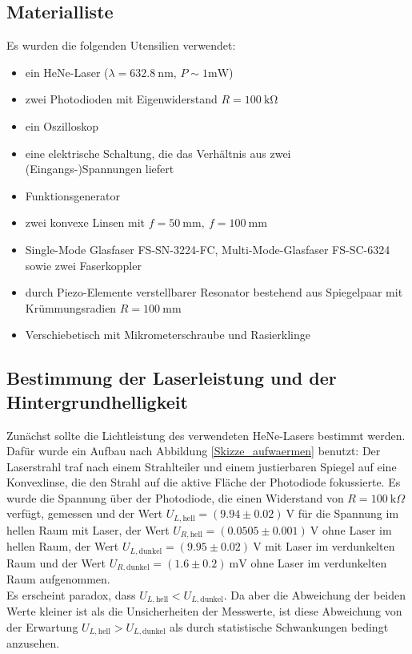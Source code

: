 \documentclass[11pt,a4paper,oneside]{scrartcl}
\begin{document}
\subsection{Materialliste}
Es wurden die folgenden Utensilien verwendet:
\begin{itemize}
\item ein HeNe-Laser ($\lambda=632.8\ \mathrm{nm}$, $P\sim 1\mathrm{mW}$)
\item zwei Photodioden mit Eigenwiderstand $R=100\ \mathrm{k\Omega}$
\item ein Oszilloskop
\item eine elektrische Schaltung, die das Verhältnis aus zwei (Eingangs-)Spannungen liefert
\item Funktionsgenerator
\item zwei konvexe Linsen mit $f=50\ \mathrm{mm},\ f=100\ \mathrm{mm}$
\item Single-Mode Glasfaser FS-SN-3224-FC, Multi-Mode-Glasfaser FS-SC-6324 sowie zwei Faserkoppler
\item durch Piezo-Elemente verstellbarer Resonator bestehend aus Spiegelpaar mit Krümmungsradien $R=100\ \mathrm{mm}$
\item Verschiebetisch mit Mikrometerschraube und Rasierklinge
\end{itemize}
\subsection{Bestimmung der Laserleistung und der Hintergrundhelligkeit}
Zunächst sollte die Lichtleistung des verwendeten HeNe-Lasers bestimmt werden. Dafür wurde ein Aufbau nach Abbildung \ref{Skizze_aufwaermen} benutzt: Der Laserstrahl traf nach einem Strahlteiler und einem justierbaren Spiegel auf eine Konvexlinse, die den Strahl auf die aktive Fläche der Photodiode fokussierte. Es wurde die Spannung über der Photodiode, die einen Widerstand von $R=100\ \mathrm{k}\Omega$ verfügt, gemessen und der Wert $U_{L,\mathrm{hell}}=(9.94\pm 0.02)\ \mathrm V$ für die Spannung im hellen Raum mit Laser, der Wert $U_{R,\mathrm{hell}}=(0.0505\pm 0.001)\ \mathrm V$ ohne Laser im hellen Raum, der Wert  $U_{L,\mathrm{dunkel}}=(9.95\pm 0.02)\ \mathrm V$ mit Laser im verdunkelten Raum und der Wert  $U_{R,\mathrm{dunkel}}=(1.6\pm 0.2)\ \mathrm{mV}$ ohne Laser im verdunkelten Raum aufgenommen.\\
Es erscheint paradox, dass $U_{L,\mathrm{hell}}<U_{L,\mathrm{dunkel}}$. Da aber die Abweichung der beiden Werte kleiner ist als die Unsicherheiten der Messwerte, ist diese Abweichung von der Erwartung $U_{L,\mathrm{hell}}>U_{L,\mathrm{dunkel}}$ als durch statistische Schwankungen bedingt anzusehen.
 
\end{document}
